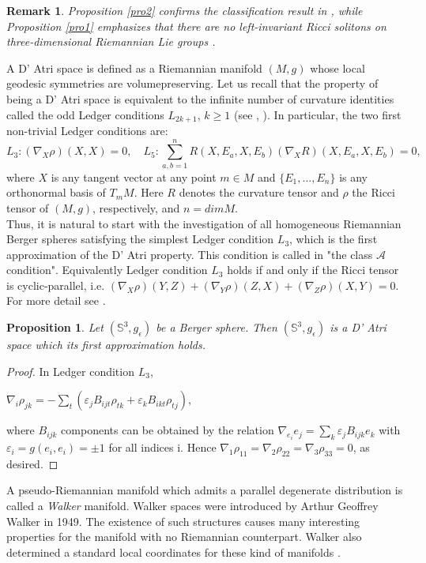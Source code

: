 \documentclass[11pt,oneside,leqno]{amsart}
\theoremstyle{plain}
\newtheorem{remark}{Remark}
\newtheorem{prop}[theorem]{Proposition}
\begin{document}
\begin{remark}
 Proposition \eqref{pro2} confirms the classification result in \cite{MB}, while Proposition \eqref{pro1} emphasizes that there are no left-invariant Ricci solitons on three-dimensional Riemannian Lie groups \cite{d111}.
 \end{remark}
A D' Atri space is defined as a Riemannian manifold $(M, g)$ whose local geodesic symmetries are volumepreserving. Let us recall that the property of being a D' Atri space is
equivalent to the infinite number of curvature identities called the odd Ledger conditions $L_{2k+1}$, $k\geq 1$ (see \cite{d1}, \cite{s1}). In particular, the two first non-trivial Ledger conditions are:
\begin{equation}
L_3: (\nabla_X \rho)(X,X)=0,\quad L_5: \sum_{a,b=1}^nR(X,E_a,X,E_b)(\nabla_X R)(X,E_a,X,E_b)=0,
\end{equation}
where $X$ is any tangent vector at any point $m\in M$ and $\lbrace E_1, . . . , E_n\rbrace$ is any orthonormal basis of $T_mM$. Here $R$ denotes
the curvature tensor and $\rho$ the Ricci tensor of $(M, g)$, respectively, and $n = dimM$.\\
Thus, it is natural to start with the investigation of all homogeneous Riemannian Berger spheres satisfying the simplest Ledger condition $L_3$, which is the first approximation of the D' Atri property. This condition is called in \cite{p112} "the class
${\mathcal A}$ condition". Equivalently Ledger condition $L_3$ holds if and only if
the Ricci tensor is cyclic-parallel, i.e. $ (\nabla_X \rho)(Y,Z)+ (\nabla_Y \rho)(Z,X)+ (\nabla_Z \rho)(X,Y)=0$.
For more detail see \cite{c1}.
\begin{prop} 
Let $({{\mathbb S}}^3, g_{\epsilon})$ be a Berger sphere. Then $({{\mathbb S}}^3, g_{\epsilon})$ is a D' Atri space which its first approximation holds.
\end{prop}
\begin{proof}
In Ledger condition $L_3$,
\begin{center}
$\nabla_i\rho_{jk}=-\sum_t(\varepsilon_jB_{ijt}\rho_{tk}+\varepsilon_k B_{ikt}\rho_{tj}),$
\end{center}
where  $B_{ijk}$ components can be obtained by the relation $\nabla_{e_i}e_j =\sum_k\varepsilon_j B_{ijk}e_k$ with $\varepsilon_i=g(e_i,e_i)=\pm1$ for all indices i.
Hence $\nabla_1\rho_{11}=\nabla_2\rho_{22}=\nabla_3\rho_{33}=0$, as desired.
\end{proof}
A pseudo-Riemannian manifold which admits a parallel degenerate distribution is called a {\em Walker} manifold. Walker spaces were introduced by Arthur Geoffrey Walker in 1949. The existence of such structures causes many interesting properties for the manifold with no Riemannian counterpart. Walker also determined a standard local coordinates for these kind of manifolds \cite{Wa1,Wa2}.
\end{document}
